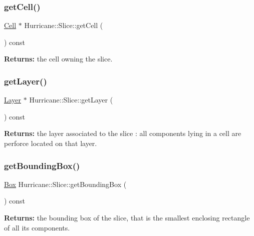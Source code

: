 \subsubsection{\texorpdfstring{get\+Cell()}{getCell()}}
{\footnotesize\ttfamily \hyperlink{classHurricane_1_1Cell}{Cell} $\ast$ Hurricane\+::\+Slice\+::get\+Cell (\begin{DoxyParamCaption}{ }\end{DoxyParamCaption}) const\hspace{0.3cm}{\ttfamily [inline]}}

{\bfseries Returns\+:} the cell owning the slice. \mbox{\label{classHurricane_1_1Slice_a76c011cd461e588474a22fd0026e1f8f}} 
\subsubsection{\texorpdfstring{get\+Layer()}{getLayer()}}
{\footnotesize\ttfamily \hyperlink{classHurricane_1_1Layer}{Layer} $\ast$ Hurricane\+::\+Slice\+::get\+Layer (\begin{DoxyParamCaption}{ }\end{DoxyParamCaption}) const\hspace{0.3cm}{\ttfamily [inline]}}

{\bfseries Returns\+:} the layer associated to the slice \+: all components lying in a cell are perforce located on that layer. \mbox{\label{classHurricane_1_1Slice_aa1a139b188879c37a8878a2353401d65}} 
\subsubsection{\texorpdfstring{get\+Bounding\+Box()}{getBoundingBox()}}
{\footnotesize\ttfamily \hyperlink{classHurricane_1_1Box}{Box} Hurricane\+::\+Slice\+::get\+Bounding\+Box (\begin{DoxyParamCaption}{ }\end{DoxyParamCaption}) const\hspace{0.3cm}{\ttfamily [inline]}}

{\bfseries Returns\+:} the bounding box of the slice, that is the smallest enclosing rectangle of all its components. 


